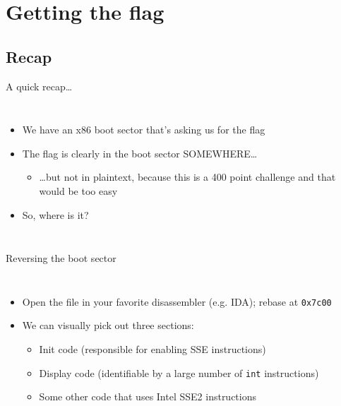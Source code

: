 
\section{Getting the flag}

\subsection{Recap}

\begin{frame}{A quick recap\ldots}
    \begin{columns}
        \begin{itemize}
            \item<1-> We have an x86 boot sector that's asking us for the flag
            \item<2-> The flag is clearly in the boot sector SOMEWHERE\ldots
            \begin{itemize}
                \item<3-> \ldots but not in plaintext, because this is a 400
                          point challenge and that would be too easy
            \end{itemize}
            \item<4-> So, where is it?
        \end{itemize}
    \end{columns}
\end{frame}

\begin{frame}{Reversing the boot sector}
    \begin{columns}
        \begin{itemize}
            \item<1-> Open the file in your favorite disassembler (e.g. IDA);
                      rebase at \texttt{0x7c00}
            \item<2-> We can visually pick out three sections:
            \begin{itemize}
                \item<2-> Init code (responsible for enabling SSE instructions)
                \item<2-> Display code (identifiable by a large number of
                          \texttt{int} instructions)
                \item<2-> Some other code that uses Intel SSE2 instructions
            \end{itemize}
        \end{itemize}
    \end{columns}
\end{frame}

